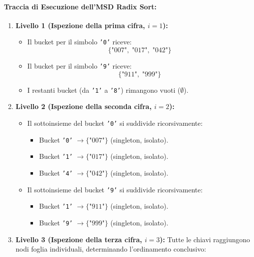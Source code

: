 \paragraph{Traccia di Esecuzione dell'MSD Radix Sort:}
\begin{enumerate}
  \item \textbf{Livello 1 (Ispezione della prima cifra, $i = 1$):}
  \begin{itemize}
    \item Il bucket per il simbolo \texttt{'0'} riceve:
    \begin{equation*}
      \{\text{"007"}, \; \text{"017"}, \; \text{"042"}\}
    \end{equation*}
    \item Il bucket per il simbolo \texttt{'9'} riceve:
    \begin{equation*}
      \{\text{"911"}, \; \text{"999"}\}
    \end{equation*}
    \item I restanti bucket (da \texttt{'1'} a \texttt{'8'}) rimangono vuoti ($\emptyset$).
  \end{itemize}
  \item \textbf{Livello 2 (Ispezione della seconda cifra, $i = 2$):}
  \begin{itemize}
    \item Il sottoinsieme del bucket \texttt{'0'} si suddivide ricorsivamente:
    \begin{itemize}
      \item Bucket \texttt{'0'} $\to \{\text{"007"}\}$ (singleton, isolato).
      \item Bucket \texttt{'1'} $\to \{\text{"017"}\}$ (singleton, isolato).
      \item Bucket \texttt{'4'} $\to \{\text{"042"}\}$ (singleton, isolato).
    \end{itemize}
    \item Il sottoinsieme del bucket \texttt{'9'} si suddivide ricorsivamente:
    \begin{itemize}
      \item Bucket \texttt{'1'} $\to \{\text{"911"}\}$ (singleton, isolato).
      \item Bucket \texttt{'9'} $\to \{\text{"999"}\}$ (singleton, isolato).
    \end{itemize}
  \end{itemize}
  \item \textbf{Livello 3 (Ispezione della terza cifra, $i = 3$):}
  Tutte le chiavi raggiungono nodi foglia individuali, determinando l'ordinamento conclusivo:
  \begin{equation}
    [\text{"007"}, \; \text{"017"}, \; \text{"042"}, \; \text{"911"}, \; \text{"999"}]
  \end{equation}
\end{enumerate}

